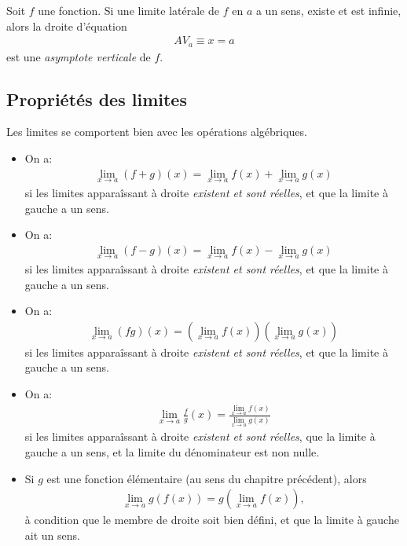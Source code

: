 \documentclass[main.tex]{subfiles}
\begin{document}
\begin{definition}

    Soit $f$ une fonction.
    Si une limite latérale de $f$ en $a$ a un sens, existe et est infinie,
    alors la droite d'équation
    \begin{align}
        AV_a \equiv x = a
    \end{align}
    est une \emph{asymptote verticale} de $f$.
\end{definition}

\subsection{Propriétés des limites}

Les limites se comportent bien avec les opérations algébriques.

\begin{howto}

    \begin{itemize}
        \item On a:
            \begin{align}
                \lim_{x \to a} (f + g)(x) = \lim_{x \to a} f(x) + \lim_{x \to a} g(x)
            \end{align}
            si les limites apparaîssant à droite \emph{existent et sont réelles},
            et que la limite à gauche a un sens.
        \item On a:
            \begin{align}
                \lim_{x \to a} (f - g)(x) = \lim_{x \to a} f(x) - \lim_{x \to a} g(x)
            \end{align}
            si les limites apparaîssant à droite \emph{existent et sont réelles},
            et que la limite à gauche a un sens.
        \item On a:
            \begin{align}
                \lim_{x \to a} (f g)(x) = \left(\lim_{x \to a} f(x)\right) \left(\lim_{x \to a} g(x)\right)
            \end{align}
            si les limites apparaîssant à droite \emph{existent et sont réelles},
            et que la limite à gauche a un sens.
        \item On a:
            \begin{align}
                \lim_{x \to a} \frac f g(x) = \frac {\lim_{x \to a} f(x)} {\lim_{x \to a} g(x)}
            \end{align}
            si les limites apparaîssant à droite \emph{existent et sont réelles},
            que la limite à gauche a un sens,
            et la limite du dénominateur est non nulle.
        \item Si $g$ est une fonction élémentaire (au sens du chapitre précédent),
            alors
            \begin{align*}
                \lim_{x \to a} g(f(x)) = g(\lim_{x \to a} f(x)),
            \end{align*}
            à condition que le membre de droite soit bien défini,
            et que la limite à gauche ait un sens.
    \end{itemize}
\end{howto}
\end{document}
